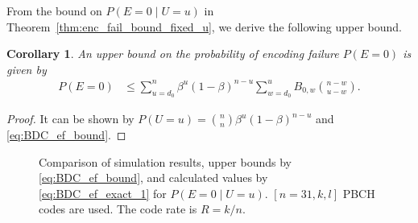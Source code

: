 \documentclass[10pt,twocolumn,twoside,submit]{JCNtran}
\newtheorem{corollary}[theorem]{Corollary}
\begin{document}
	From the bound on $P(E=0 \mid U=u)$ in Theorem~\ref{thm:enc_fail_bound_fixed_u}, we derive the following upper bound.
	
	\begin{corollary}\label{cor:BDC_UB_1} An upper bound on the probability of encoding failure $P\left(E = 0 \right)$ is given by 
	\begin{align}
	P(E=0)
	&\le \sum_{u=d_0}^{n}{ \beta^{u} \left( 1 - \beta \right)^{n-u}}\sum_{w=d_0}^{u}{B_{0,w} \binom{n-w}{u-w}} \label{eq:bound_enc_fail_2}.	
	\end{align}
	\end{corollary}
	\begin{proof}	
		It can be shown by $P(U=u) = \binom{n}{n} \beta^u (1-\beta)^{n-u}$ and \eqref{eq:BDC_ef_bound}. 
	\end{proof}

	\begin{figure}[!t]
	\centering
	\hfill 
	\caption{Comparison of simulation results, upper bounds by \eqref{eq:BDC_ef_bound}, and calculated values by \eqref{eq:BDC_ef_exact_1} for $P(E = 0 \mid U=u)$. $[n = 31, k, l]$ PBCH codes are used. The code rate is $R = k/n$.}
	\label{fig:plot_fixed_u}
	\vspace{-5mm}
	\end{figure}
	
\end{document}
